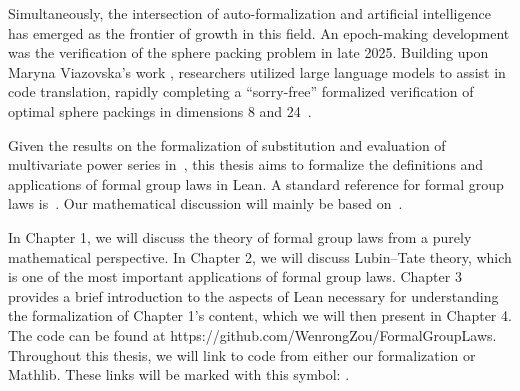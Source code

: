 Simultaneously, the intersection of auto-formalization and artificial
intelligence has emerged as the frontier of growth in this field. An
epoch-making development was the verification of the sphere packing problem
in late 2025. Building upon Maryna Viazovska's work
\cite{viazovska2017sphere},
researchers utilized large language models to assist in code translation,
rapidly completing a ``sorry-free'' formalized verification of
optimal sphere packings
in dimensions 8 and 24~\cite{hariharan2026milestoneformalizationspherepacking}.

Given the results on the formalization of substitution and evaluation of
multivariate power series in~\cite{chambertloir2025formalizationdividedpowerslean},
this thesis aims to formalize the definitions and applications of formal
group laws in Lean. A standard reference for formal group laws
is~\cite{hazewinkel1978formal}. Our mathematical discussion will mainly
be based on~\cite{hazewinkel1978formal, cassels1967algebraic, LubinTate1965,
silverman2009arithmetic}.

In Chapter 1, we will discuss the theory of formal group laws from a purely
mathematical perspective. In Chapter 2, we will discuss Lubin--Tate theory,
which is one of the most important applications of formal group laws. Chapter
3 provides a brief introduction to the aspects of Lean necessary for
understanding the formalization of Chapter 1's content, which we will
then present in Chapter 4. The code can be found at
https://github.com/WenrongZou/FormalGroupLaws.
Throughout this thesis, we will link to code from either our formalization
or Mathlib. These links will be marked with this symbol: \href{https://github.com/WenrongZou/FormalGroupLaws/blob/main/FormalGroupLaws/Basic.lean}{\faExternalLink}.


